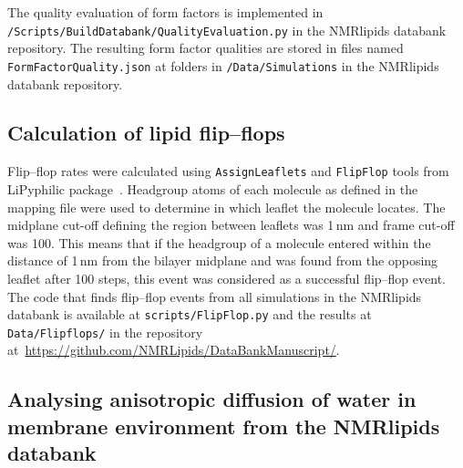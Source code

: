 \documentclass[fleqn,10pt]{wlscirep}
\begin{document}
The quality evaluation of form factors is implemented in \texttt{/Scripts/BuildDatabank/QualityEvaluation.py} in the NMRlipids databank repository. The resulting form factor qualities are stored in files named \texttt{FormFactorQuality.json} at folders in \texttt{/Data/Simulations} in the NMRlipids databank repository.


\subsection{Calculation of lipid flip--flops}
Flip--flop rates were calculated using \texttt{AssignLeaflets} and \texttt{FlipFlop} tools from LiPyphilic package~\cite{LiPyphilic2021}. Headgroup atoms of each molecule as defined in the mapping file were used to determine in which leaflet the molecule locates. The midplane cut-off defining the region between leaflets was 1\,nm and frame cut-off was 100. This means that if the headgroup of a molecule entered within the distance of 1\,nm from the bilayer midplane and was found from the opposing leaflet after 100 steps, this event was considered as a successful flip--flop event. The code that finds flip--flop events from all simulations in the NMRlipids databank is available at \texttt{scripts/FlipFlop.py} and the results at \texttt{Data/Flipflops/} in the repository at~\url{https://github.com/NMRLipids/DataBankManuscript/}. 


\subsection{Analysing anisotropic diffusion of water in membrane environment from the NMRlipids databank}


\end{document}
